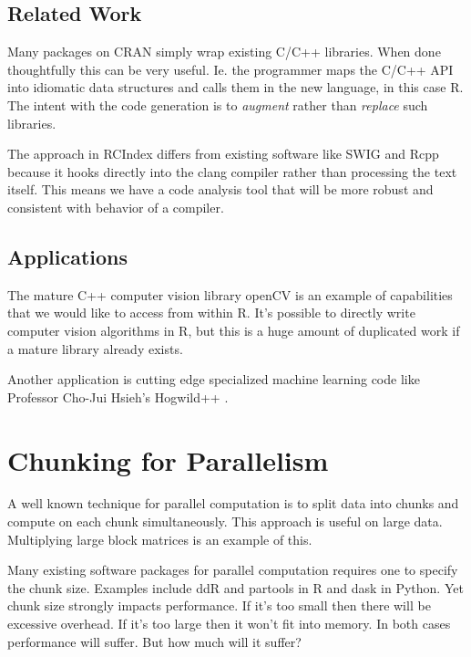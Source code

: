 \documentclass[12pt]{article}
\begin{document}
\subsection{Related Work}

Many packages on CRAN simply wrap existing C/C++ libraries. When done
thoughtfully this can be very useful. Ie. the programmer maps the C/C++ API
into idiomatic data structures and calls them in the new language, in this case
R. 
The intent with the code generation is to \emph{augment} rather than
\emph{replace} such libraries. 

The approach in RCIndex differs from existing software like SWIG
\cite{swig} and Rcpp \cite{R-Rcpp} because it hooks directly into the clang
compiler rather than processing the text itself. This means we have a code
analysis tool that will be more robust and consistent with behavior of a compiler. 



\subsection{Applications}

The mature C++ computer vision library openCV
\cite{opencv_library} is an example of capabilities that we would like to
access from within R. It's possible to directly write computer vision
algorithms in R, but this is a huge amount of duplicated work if a mature
library already exists.

Another application is cutting edge specialized machine learning code like
Professor Cho-Jui Hsieh's Hogwild++ \cite{zhang2016hogwild}.

\section{Chunking for Parallelism}

A well known technique for parallel computation is to split data into
chunks and compute on each chunk simultaneously. This approach 
is useful on large data. Multiplying large block matrices is an example of this.

Many existing software packages for parallel computation requires one to specify the
chunk size. Examples include ddR \cite{R-ddR} and partools
\cite{R-partools} in R and dask in Python.
Yet chunk size strongly impacts
performance. If it's too small then there will be excessive overhead. If
it's too large then it won't fit into memory. In both cases performance
will suffer. But how much will it suffer?
\end{document}
